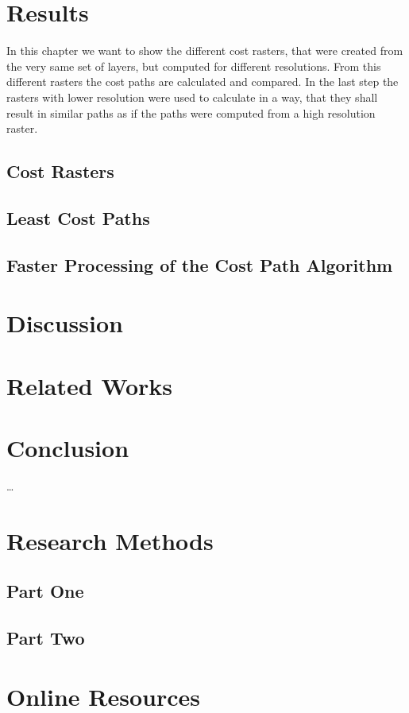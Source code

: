 \documentclass[acmtog]{acmart}
\begin{document}
	\section{Results}
	In this chapter we want to show the different cost rasters, that were created from the very same set of layers, but computed for different resolutions. From this different rasters the cost paths are calculated and compared. In the last step the rasters with lower resolution were used to calculate in a way, that they shall result in similar paths as if the paths were computed from a high resolution raster.
	\subsection{Cost Rasters}
	\subsection{Least Cost Paths}
	\subsection{Faster Processing of the Cost Path Algorithm}
	
	\section{Discussion}
	\section{Related Works}
	\section{Conclusion}


	

	





\begin{acks}
	\ldots
\end{acks}





\appendix

\section{Research Methods}

\subsection{Part One}



\subsection{Part Two}



\section{Online Resources}
\end{document}
